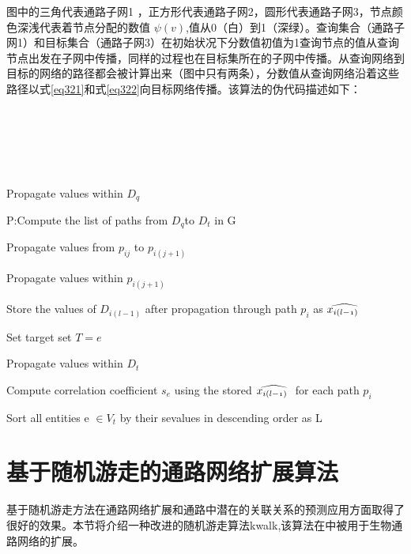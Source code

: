 图中的三角代表通路子网1 ，正方形代表通路子网2，圆形代表通路子网3，节点颜色深浅代表着节点分配的数值 $\psi (v)$,值从0（白）到1（深绿）。查询集合（通路子网1）和目标集合（通路子网3）在初始状况下分数值初值为1查询节点的值从查询节点出发在子网中传播，同样的过程也在目标集所在的子网中传播。从查询网络到目标的网络的路径都会被计算出来（图中只有两条），分数值从查询网络沿着这些路径以式\ref{eq321}和式\ref{eq322}向目标网络传播。该算法的伪代码描述如下：
\\
\\
\\
\\
\\
\\



\begin{algorithm}
%

Propagate values within $D_{q}$

P:Compute the list of paths from $D_{q}$to $D_{t}$ in G

{
	{
		Propagate values from $p_{ij}$ to $p_{i(j+1)}$
		
		Propagate values within $p_{i(j+1)}$
    }

    Store the values of $D_{i(l−1)}$ after propagation through path $p_{i}$ as $\mathnormal{\widehat{x_{i( l-1)} \ }}$
 }

{
	Set target set $T = {e}$

	Propagate values within $D_{t}$

	Compute correlation coefficient $s_{e}$ using the stored $ \mathnormal{\widehat{x_{i( l-1)} \ }}$ for each path $p_{i}$
}

Sort all entities e $\in V_{t}$ by their sevalues in descending order as L

\end{algorithm}
\section{基于随机游走的通路网络扩展算法}
基于随机游走方法在通路网络扩展和通路中潜在的关联关系的预测应用方面取得了很好的效果。本节将介绍一种改进的随机游走算法kwalk\cite{zhang2016limited},该算法在\cite{zhang2016network}中被用于生物通路网络的扩展。


